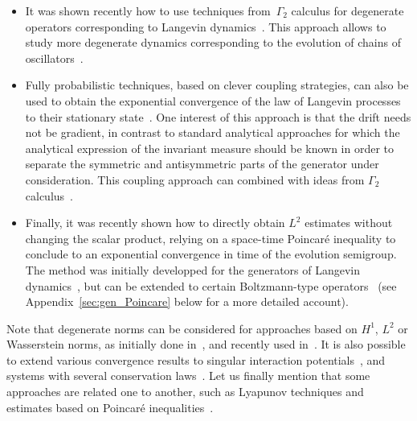 \documentclass[AHL,Unicode,longabstracts,MathTools,published]{cedram}
\begin{document}
\begin{itemize}
\item It was shown recently how to use techniques from~$\Gamma_2$ calculus for degenerate operators corresponding to Langevin dynamics~\cite{Baudoin17, Mon19a}. This approach allows to study more degenerate dynamics corresponding to the evolution of chains of oscillators~\cite{Menegaki19}.

\item Fully probabilistic techniques, based on clever coupling strategies, can also be used to obtain the exponential convergence of the law of Langevin processes to their stationary state~\cite{EGZ19}. One interest of this approach is that the drift needs not be gradient, in contrast to standard analytical approaches for which the analytical expression of the invariant measure should be known in order to separate the symmetric and antisymmetric parts of the generator under consideration. This coupling approach can combined with ideas from $\Gamma_2$ calculus~\cite{CG14}.

\item Finally, it was recently shown how to directly obtain $L^2$ estimates without changing the scalar product, relying on a space-time Poincaré inequality to conclude to an exponential convergence in time of the evolution semigroup. The method was initially developped for the generators of Langevin dynamics~\cite{AM19,CLW19}, but can be extended to certain Boltzmann-type operators~\cite{LW20} (see Appendix~\ref{sec:gen_Poincare} below for a more detailed account).
\end{itemize}
Note that degenerate norms can be considered for approaches based on $H^1$, $L^2$ or Wasserstein norms, as initially done in~\cite{Talay02}, and recently used in~\cite{Baudoin17,OL15,IOS19}. It is also possible to extend various convergence results to singular interaction potentials~\cite{BGH19,CHSG21,Herzog18,HM19}, and systems with several conservation laws~\cite{CDHMMS21}. Let us finally mention that some approaches are related one to another, such as Lyapunov techniques and estimates based on Poincaré inequalities~\cite{BCG08}.
\vspace{30pt}
\end{document}
